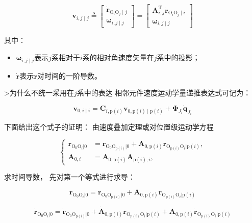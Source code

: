 \[
\boldsymbol{v}_{i, j \mid j} \triangleq\left[\begin{array}{c}
 \dot{\boldsymbol{r}}_{\mathrm{O}_{i} \mathrm{O}_{j} \mid j} \\
\boldsymbol{\omega}_{i, j \mid j}
\end{array}\right]=
\left[\begin{array}{c}
\boldsymbol{A}_{i, j}^{\mathrm{T}} \dot{\boldsymbol{r}}_{\mathrm{O}_{i} \mathrm{O}_{j} \mid i} \\
\boldsymbol{\omega}_{i, j \mid j}
\end{array}\right]
\]

其中：

\begin{itemize}

\item $\boldsymbol{\omega}_{i, j \mid j}$表示$j$系相对于$i$系的相对角速度矢量在$j$系中的投影；

\item $\dot{\boldsymbol{r}}$表示$\boldsymbol{r}$对时间的一阶导数。

\end{itemize}
>为什么不统一采用在$j$系中的表达
相邻元件速度运动学量递推表达式可记为：

\[
\boldsymbol{v}_{0,i\mid i}=\boldsymbol{C}_{i,\mathrm{p}(i)}\boldsymbol{v}_{0,\mathrm{p}(i)\mid \mathrm{p}(i)}+\boldsymbol{\Phi}_{J_{i}}\dot{\boldsymbol{q}}_{J_{i}}
\]

下面给出这个式子的证明： 由速度叠加定理或对位置级运动学方程

\[
\left.\left\{\begin{array}{rl}\boldsymbol{r}_{\mathrm{O}_0\mathrm{O}_i|0}&=\boldsymbol{r}_{\mathrm{O}_0\mathrm{O}_{\mathrm{p}(i)}|0}+ \boldsymbol{A}_{0,\mathrm{p}(i)}\boldsymbol{r}_{\mathrm{O}_{\mathrm{p}(i)}\mathrm{O}_i|\mathrm{p}(i)},\\\boldsymbol{A}_{0,i}&=\boldsymbol{A}_{0,\mathrm{p}(i)}\boldsymbol{A}_{\mathrm{p}(i),i},\end{array}\right.\right.
\]

求时间导数，
先对第一个等式进行求导：

\[
\boldsymbol{r}_{\mathrm{O}_0\mathrm{O}_i|0}=\boldsymbol{r}_{\mathrm{O}_0\mathrm{O}_{\mathrm{p}(i)}|0}+ \boldsymbol{A}_{0,\mathrm{p}(i)}\boldsymbol{r}_{\mathrm{O}_{\mathrm{p}(i)}\mathrm{O}_i|\mathrm{p}(i)}
\]

\[
\dot{\boldsymbol{r}}_{\mathrm{O}_0\mathrm{O}_i|0}=\dot{\boldsymbol{r}}_{\mathrm{O}_0\mathrm{O}_{\mathrm{p}(i)}|0}+ \dot{\boldsymbol{A}}_{0,\mathrm{p}(i)}\boldsymbol{r}_{\mathrm{O}_{\mathrm{p}(i)}\mathrm{O}_i|\mathrm{p}(i)}+\boldsymbol{A}_{0,\mathrm{p}(i)}\dot{\boldsymbol{r}}_{\mathrm{O}_{\mathrm{p}(i)}\mathrm{O}_i|\mathrm{p}(i)}
\]

